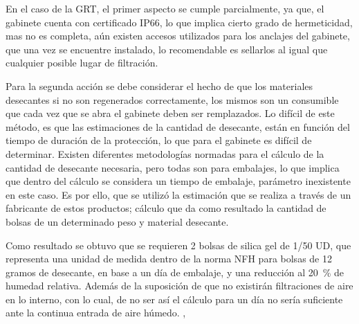 En el caso de la GRT, el primer aspecto se cumple parcialmente, ya que, el gabinete cuenta con certificado IP66, lo que implica cierto grado de hermeticidad, mas no es completa, aún existen accesos utilizados para los anclajes del gabinete, que una vez se encuentre instalado, lo recomendable es sellarlos al igual que cualquier posible lugar de filtración.

Para la segunda acción se debe considerar el hecho de que los materiales desecantes si no son regenerados correctamente, los mismos son un consumible que cada vez que se abra el gabinete deben ser remplazados. Lo difícil de este método, es que las estimaciones de la cantidad de desecante, están en función del tiempo de duración de la protección, lo que para el gabinete es difícil de determinar. Existen diferentes metodologías normadas para el cálculo de la cantidad de desecante necesaria, pero todas son para embalajes, lo que implica que dentro del cálculo se considera un tiempo de embalaje, parámetro inexistente en este caso. Es por ello, que se utilizó la estimación que se realiza a través de un fabricante de estos productos; cálculo que da como resultado la cantidad de bolsas de un determinado peso y material desecante.

Como resultado se obtuvo que se requieren 2 bolsas de silica gel de 1/50 UD, que representa una unidad de medida dentro de la norma NFH para bolsas de 12 gramos de desecante, en base a un día de embalaje, y una reducción al \SI{20}{\percent} de humedad relativa. Además de la suposición de que no existirán filtraciones de aire en lo interno, con lo cual, de no ser así el cálculo para un día no sería suficiente ante la continua entrada de aire húmedo. \cite{propa},\cite{sercalia}


